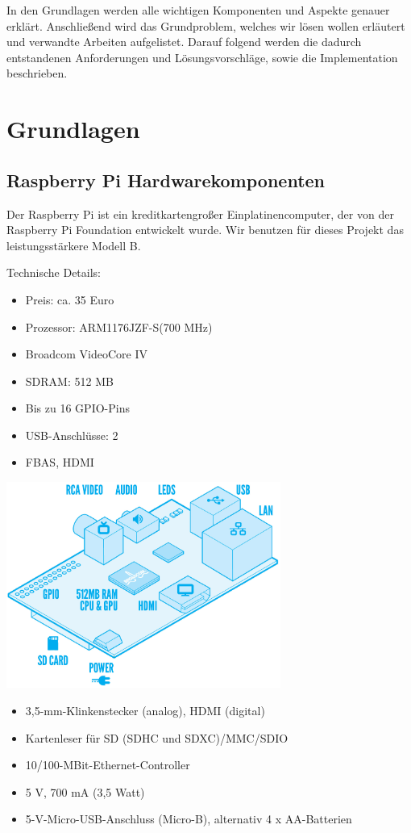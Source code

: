 \documentclass[12pt]{article}
\begin{document}
In den Grundlagen werden alle wichtigen Komponenten und Aspekte genauer erklärt. Anschließend wird das Grundproblem, welches wir lösen wollen erläutert und verwandte Arbeiten aufgelistet. 
Darauf folgend werden die dadurch entstandenen Anforderungen und Lösungsvorschläge, sowie die Implementation beschrieben.

\section{Grundlagen}

\subsection{Raspberry Pi Hardwarekomponenten}

Der Raspberry Pi ist ein kreditkartengroßer Einplatinencomputer, der von der Raspberry Pi Foundation entwickelt wurde.
Wir benutzen für dieses Projekt das leistungsstärkere Modell B.
\parbox{7,8cm}{
Technische Details:
\begin{itemize}
\item Preis: ca. 35 Euro
\item Prozessor: ARM1176JZF-S(700 MHz)
\item Broadcom VideoCore IV
\item SDRAM: 512 MB
\item Bis zu 16 GPIO-Pins
\item USB-Anschlüsse: 2
\item FBAS, HDMI
\end{itemize}
}
\parbox{5cm}{
\includegraphics[width=9cm]{Raspi.jpg}
}
\begin{itemize}
\item 3,5-mm-Klinkenstecker (analog), HDMI (digital)
\item Kartenleser für SD (SDHC und SDXC)/MMC/SDIO
\item 10/100-MBit-Ethernet-Controller 
\item 5 V, 700 mA (3,5 Watt)
\item 5-V-Micro-USB-Anschluss (Micro-B), alternativ 4 x AA-Batterien
\end{itemize}
\end{document}
